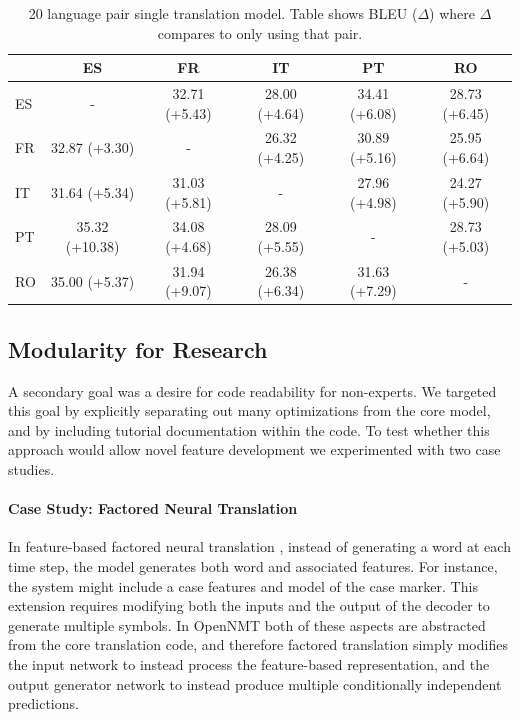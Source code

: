 \documentclass[11pt]{article}
\begin{document}
\begin{table}[ht]
  \small \centering
  \begin{tabular}{lccccc}
    \toprule
          & ES & FR & IT & PT & RO \\
    \midrule
ES	& - & 32.71 (+5.43)	 & 28.00 (+4.64) & 34.41 (+6.08) & 28.73 (+6.45) \\ 
FR	& 32.87 (+3.30)	& -  & 26.32 (+4.25)	 & 30.89 (+5.16) & 25.95 (+6.64) \\
IT     & 31.64 (+5.34)	 & 31.03 (+5.81) & - & 27.96 (+4.98) & 24.27 (+5.90) \\
PT	& 35.32 (+10.38) & 34.08 (+4.68) & 28.09 (+5.55) & - & 28.73 (+5.03)\\
RO	& 35.00 (+5.37) & 31.94 (+9.07) & 26.38 (+6.34) & 31.63 (+7.29) & -\\
    \bottomrule
  \end{tabular}
  \label{tab:esfritptro}
  \caption{\small 20 language pair single translation model. Table shows BLEU ($\Delta$) where $\Delta$ compares to only using that pair. }
\end{table}

\subsection{Modularity for Research}

A secondary goal was a desire for code readability for non-experts.
We targeted this goal by explicitly separating out many optimizations
from the core model, and by including tutorial documentation within
the code. To test whether this approach would allow novel feature
development we experimented with two case studies.

\paragraph{Case Study: Factored Neural Translation}

In feature-based factored neural translation
\cite{sennrich2016linguistic}, instead of generating a word at each
time step, the model generates both word and associated features. For
instance, the system might include a case features and model of the
case marker. This extension requires modifying both the inputs and the
output of the decoder to generate multiple symbols. In OpenNMT both of
these aspects are abstracted from the core translation code, and
therefore factored translation simply modifies the
input network to instead process the feature-based representation, and
the output generator network to instead produce multiple conditionally
independent predictions.
\end{document}
